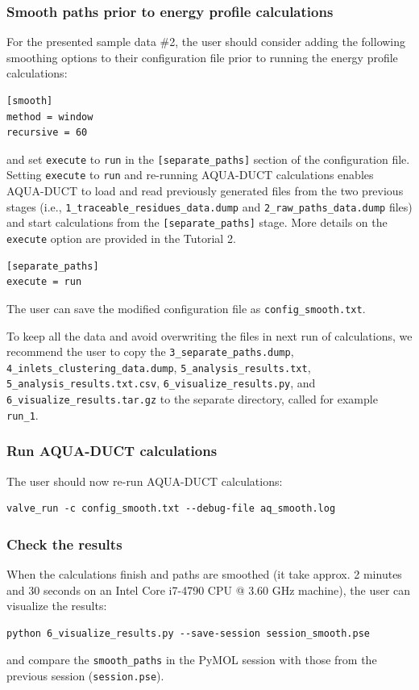 \documentclass[9pt,tutorial, pubversion]{livecoms}
\begin{document}
\subsubsection{Smooth paths prior to energy profile calculations}
For the presented sample data \#2, the user should consider adding the following smoothing options to their configuration file prior to running the energy profile calculations:
\begin{lstlisting}
[smooth]
method = window
recursive = 60
\end{lstlisting}
and set \texttt{execute} to \texttt{run} in the \texttt{[separate\_paths]} section of the configuration file. Setting \texttt{execute} to \texttt{run} and re-running AQUA-DUCT calculations enables AQUA-DUCT to load and read previously generated files from the two previous stages (i.e., \texttt{1\_traceable\_residues\_data.dump} and \texttt{2\_raw\_paths\_data.dump} files) and start calculations from the \texttt{[separate\_paths]} stage. More details on the \texttt{execute} option are provided in the Tutorial 2. 
\begin{lstlisting}
[separate_paths]
execute = run
\end{lstlisting}
The user can save the modified configuration file as \texttt{config\_smooth.txt}.

To keep all the data and avoid overwriting the files in next run of calculations, we recommend the user to copy the \texttt{3\_separate\_paths.dump}, \texttt{4\_inlets\_clustering\_data.dump}, \texttt{5\_analysis\_results.txt}, \texttt{5\_analysis\_results.txt.csv}, \texttt{6\_visualize\_results.py}, and \texttt{6\_visualize\_results.tar.gz} to the separate directory, called for example \texttt{run\_1}.

\subsubsection{Run AQUA-DUCT calculations}
The user should now re-run AQUA-DUCT calculations:
\begin{lstlisting}
valve_run -c config_smooth.txt --debug-file aq_smooth.log
\end{lstlisting}

\subsubsection{Check the results}
When the calculations finish and paths are smoothed (it take approx. 2 minutes and 30 seconds on an Intel Core i7-4790 CPU @ 3.60 GHz machine), the user can visualize the results:
\begin{lstlisting}
python 6_visualize_results.py --save-session session_smooth.pse
\end{lstlisting}
and compare the \texttt{smooth\_paths} in the PyMOL session with those from the previous session (\texttt{session.pse}). 
\end{document}
